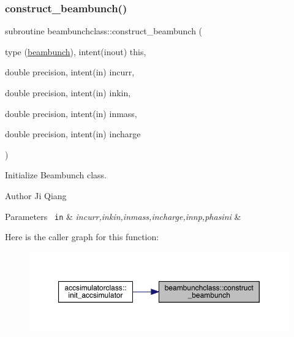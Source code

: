 \subsubsection{\texorpdfstring{construct\_beambunch()}{construct\_beambunch()}}
{\footnotesize\ttfamily subroutine beambunchclass\+::construct\+\_\+beambunch (\begin{DoxyParamCaption}\item[{type (\mbox{\hyperlink{namespacebeambunchclass_structbeambunchclass_1_1beambunch}{beambunch}}), intent(inout)}]{this,  }\item[{double precision, intent(in)}]{incurr,  }\item[{double precision, intent(in)}]{inkin,  }\item[{double precision, intent(in)}]{inmass,  }\item[{double precision, intent(in)}]{incharge }\end{DoxyParamCaption})}



Initialize Beambunch class. 

\begin{DoxyAuthor}{Author}
Ji Qiang 
\end{DoxyAuthor}

\begin{DoxyParams}[1]{Parameters}
\mbox{\texttt{ in}}  & {\em incurr,inkin,inmass,incharge,innp,phasini} & \\
\hline
\end{DoxyParams}
Here is the caller graph for this function\+:\nopagebreak
\begin{figure}[H]
\begin{center}
\leavevmode
\includegraphics[width=350pt]{namespacebeambunchclass_a1605e527eb41043dc5962da1e3bb5159_icgraph}
\end{center}
\end{figure}
\mbox{\label{namespacebeambunchclass_a875b1de387c0e2e667bfa7a33bb70311}} 
